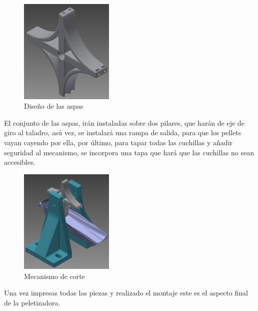     \begin{figure}[H]
            \centering
            \includegraphics[width=0.4\textwidth]{images/peletizadora/aspas.png}
            \caption{Diseño de las aspas}
            \label{fig:peletizadora_aspas}
    \end{figure}

El conjunto de las aspas, irán instaladas sobre dos pilares, que harán de eje de giro al taladro, asú vez, se instalará una rampa de salida, para que los pellets vayan cayendo por ella, por último, para tapar todas las cuchillas y añadir seguridad al mecanismo, se incorpora una tapa que hará que las cuchillas no sean accesibles.


    \begin{figure}[H]
            \centering
            \includegraphics[width=0.4\textwidth]{images/peletizadora/corte.png}
            \caption{Mecanismo de corte}
            \label{fig:peletizadora_corte}
    \end{figure}

Una vez impresas todas las piezas y realizado el montaje este es el aspecto final de la peletizadora.





